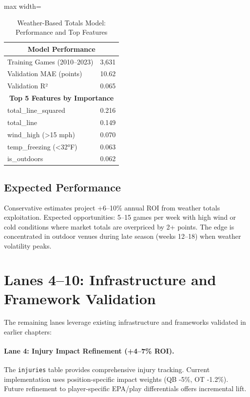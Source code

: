 \begin{table}[htbp]
\centering
\caption{Weather-Based Totals Model: Performance and Top Features}
\label{tab:weather-totals-performance}
\begin{adjustbox}{max width=\textwidth}
\begin{tabular}{@{} l r @{}}
\toprule
\multicolumn{2}{c}{\textbf{Model Performance}} \\
\midrule
Training Games (2010--2023) & 3,631 \\
Validation MAE (points) & 10.62 \\
Validation R² & 0.065 \\
\midrule
\multicolumn{2}{c}{\textbf{Top 5 Features by Importance}} \\
\midrule
total\_line\_squared & 0.216 \\
total\_line & 0.149 \\
wind\_high (>15 mph) & 0.070 \\
temp\_freezing (<32°F) & 0.063 \\
is\_outdoors & 0.062 \\
\bottomrule
\end{tabular}
\end{adjustbox}
\end{table}

\subsection{Expected Performance}

Conservative estimates project +6--10\% annual ROI from weather totals exploitation. Expected opportunities: 5--15 games per week with high wind or cold conditions where market totals are overpriced by 2+ points. The edge is concentrated in outdoor venues during late season (weeks 12--18) when weather volatility peaks.

\section{Lanes 4--10: Infrastructure and Framework Validation}

The remaining lanes leverage existing infrastructure and frameworks validated in earlier chapters:

\paragraph{Lane 4: Injury Impact Refinement (+4--7\% ROI).}
The \texttt{injuries} table provides comprehensive injury tracking. Current implementation uses position-specific impact weights (QB -5\%, OT -1.2\%). Future refinement to player-specific EPA/play differentials offers incremental lift.

